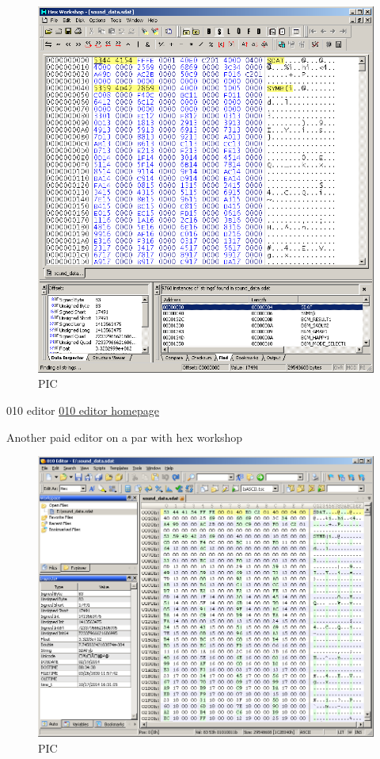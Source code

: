\documentclass[
]{book}
\begin{document}
\begin{figure}
\centering
\includegraphics{images/1_home_fast6191_romhackingguide_unrenamed_files___mhackingguidehexeditorsshowcasehexworkshop1.png}
\caption{PIC}
\end{figure}

010 editor \href{http://www.sweetscape.com/010editor/}{010 editor homepage}

Another paid editor on a par with hex workshop

\begin{figure}
\centering
\includegraphics{images/2_home_fast6191_romhackingguide_unrenamed_files___romhackingguidehexeditorsshowcase010editor1.png}
\caption{PIC}
\end{figure}
\end{document}
